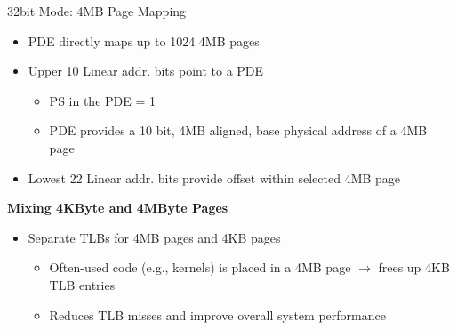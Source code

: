 \documentclass[aspectratio=169,12pt]{beamer}
\begin{document}
\begin{frame}{32bit Mode: 4MB Page Mapping}
\begin{itemize}
\item PDE directly maps up to 1024 4MB pages
\item Upper 10 Linear addr. bits point to a PDE
    \begin{itemize}
    \item PS in the PDE = 1
    \item PDE provides a 10 bit, 4MB aligned, base physical address of a 4MB page
    \end{itemize}
\item Lowest 22 Linear addr. bits provide offset within selected 4MB page
\end{itemize}

\textbf{Mixing 4KByte and 4MByte Pages}
\begin{itemize}
\item Separate TLBs for 4MB pages and 4KB pages
    \begin{itemize}
    \item Often-used code (e.g., kernels) is placed in a 4MB page $\rightarrow$ frees up 4KB TLB entries
    \item Reduces TLB misses and improve overall system performance
    \end{itemize}
\end{itemize}
\end{frame}
\end{document}
